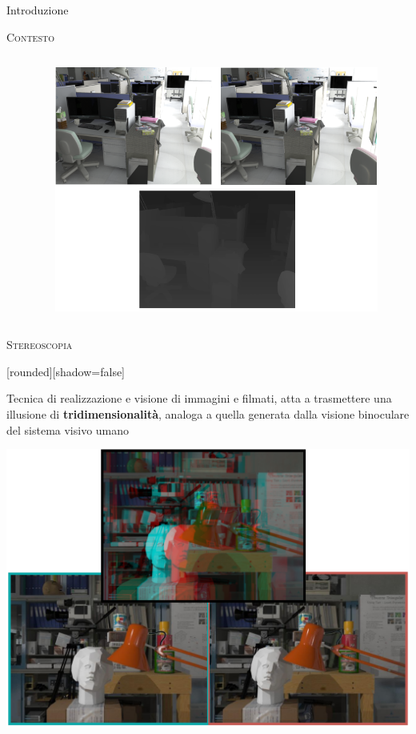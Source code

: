 \documentclass{beamer}
\begin{document}
\begin{section}{Introduzione}
\begin{frame}[t]{\textsc{Contesto}}
\begin{columns}
\begin{column}{4cm}
\begin{center}
\end{center}
\end{column}
\begin{column}{6cm}
\begin{figure}
\centering
\includegraphics[width=1\linewidth]{./img/track.png}
\end{figure}
\end{column}
\end{columns}
\end{frame}


\begin{frame}[t]{\textsc{Stereoscopia}}
\vspace{-1em}
\begin{center}
	[rounded][shadow=false]
\begin{block}{}
	\center Tecnica di realizzazione e visione di immagini e filmati, atta a trasmettere una illusione di \textbf{tridimensionalit\`{a}}, analoga a quella generata dalla visione binoculare del sistema visivo umano
	\end{block}
\end{center}
\begin{center}
\includegraphics[width=0.7\linewidth]{./img/stereo.png}
\end{center}
\end{frame}


\end{section}
\end{document}
